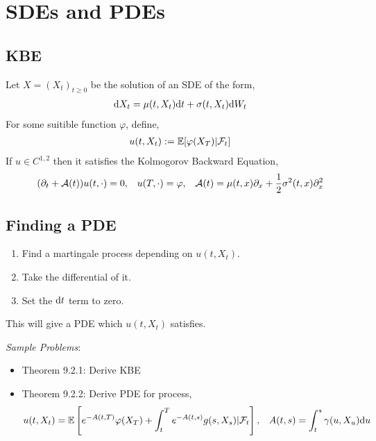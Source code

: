 \documentclass[12pt]{article}
\begin{document}
\pagebreak
\section{SDEs and PDEs}

\subsection{KBE}
Let \( X = (X_t)_{t\geq 0} \) be the solution of an SDE of the form,
\begin{align*}
    \mathrm{d} X_t = \mu(t,X_t)\mathrm{d} t + \sigma(t,X_t)\mathrm{d} W_t
\end{align*}
For some suitible function \( \varphi \), define,
\begin{align*}
    u(t,X_t):= \mathbb{E}[\varphi(X_T)|\mathcal{F}_t]
\end{align*}
If \( u\in C^{1,2} \) then it satisfies the Kolmogorov Backward Equation,
\begin{align*}
    (\partial_t + \mathcal{A}(t)) u(t,\cdot) = 0, && u(T,\cdot) = \varphi, && \mathcal{A}(t) = \mu(t,x) \partial_x + \frac{1}{2}\sigma^2(t,x)\partial^2_x
\end{align*}

\subsection{Finding a PDE}
\begin{enumerate}[nolistsep]
    \item Find a martingale process depending on \( u(t,X_t) \).
    \item Take the differential of it.
    \item Set the \( \mathrm{d} t \) term to zero.
\end{enumerate}

This will give a PDE which \( u(t,X_t) \) satisfies.

\textit{Sample Problems}:
\begin{itemize}[nolistsep]
    \item Theorem 9.2.1: Derive KBE
    \item Theorem 9.2.2: Derive PDE for process,
        \begin{align*}
            u(t,X_t) = \mathbb{E} \left[ e^{-A(t,T)}\varphi(X_T) + \int_t^T e^{-A(t,s)}g(s,X_s) | \mathcal{F}_t \right], && A(t,s) = \int_t^s \gamma(u,X_u)\mathrm{d} u
        \end{align*}
        
\end{itemize}
\end{document}
